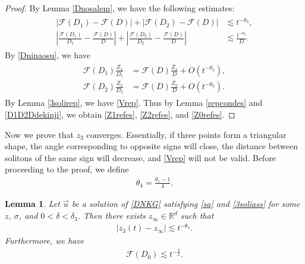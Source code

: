\documentclass[reqno]{amsart}
\theoremstyle{plain}
\newtheorem{lemma}[theorem]{Lemma}
\theoremstyle{definition}
\numberwithin{equation}{section}
\newcommand{\1}{\mathbbm{1}}
\begin{document}
\begin{proof}
By Lemma \ref{Dnosalem}, we have the following estimates:
\begin{align}\label{Dninaosu}
\begin{aligned}
\left| \mathcal{F}(D_1)-\mathcal{F}(D)\right|+\left|\mathcal{F}(D_2)-\mathcal{F}(D)\right|&\lesssim t^{-\theta_3},
\\
\left|\frac{\mathcal{F}(D_1)}{D_1}-\frac{\mathcal{F}(D)}{D}\right|+\left|\frac{\mathcal{F}(D_2)}{D_2}-\frac{\mathcal{F}(D)}{D}\right|&\lesssim \frac{t^{-\theta_3}}{D}.
\end{aligned}
\end{align}
By \eqref{Dninaosu}, we have
\begin{align}\label{D1D2Ddekinji}
\begin{aligned}
\mathcal{F}(D_1)\frac{Z_1}{D_1}&=\mathcal{F}(D)\frac{Z_1}{D}+O(t^{-\theta_3}),
\\
\mathcal{F}(D_2)\frac{Z_2}{D_2}&=\mathcal{F}(D)\frac{Z_2}{D}+O(t^{-\theta_3}).
\end{aligned}
\end{align}
By Lemma \ref{3solirep}, we have \eqref{Vrep}. Thus by Lemma \ref{repcondes} and \eqref{D1D2Ddekinji}, we obtain \eqref{Z1refes}, \eqref{Z2refes}, and \eqref{Z0refes}.
\end{proof}
Now we prove that $z_3$ converges. Essentially, if three points form a triangular shape, the angle corresponding to opposite signs will close, the distance between solitons of the same sign will decrease, and \eqref{Vrep} will not be valid. Before proceeding to the proof, we define 
\begin{align}\label{theta4}
\theta_4=\frac{\theta_1-1}{4}.
\end{align}
\begin{lemma}\label{modifiedZ}
Let $\vec{u}$ be a solution of \eqref{DNKG} satisfying \eqref{sa} and \eqref{3soliass} for some $z,\ \sigma$, and $0<\delta<\delta_3$. Then there exists $z_{\infty}\in \mathbb{R}^d$ such that
\begin{align}\label{z3es}
|z_3(t)-z_{\infty}|\lesssim t^{-\theta_4}.
\end{align}
Furthermore, we have
\begin{align}\label{D0esnew}
\mathcal{F}(D_0)\lesssim t^{-\frac{3}{2}}.
\end{align}
\end{lemma}
\end{document}
